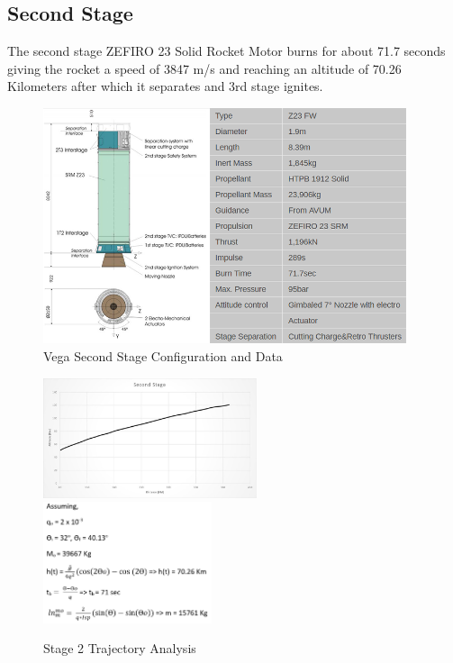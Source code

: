 \documentclass[11pt,fleqn]{book} %
\begin{document}
\newpage

\subsection{Second Stage}

The second stage ZEFIRO 23 Solid Rocket Motor burns for about 71.7 seconds giving the rocket a speed of 3847 m/s and reaching an altitude of 70.26 Kilometers after which it separates and 3rd stage ignites.  
\begin{figure}[h]
    \centering
    \includegraphics[width=0.95\textwidth]{Stage2.png}
    \caption{Vega Second Stage Configuration and Data}
    \label{fig:super}
\end{figure}

\begin{figure}[h]
    \includegraphics[width=0.56\textwidth]{Stage_2_Plot.jpg}
    \includegraphics[width=0.44\textwidth]{Stage2_Cal.png}
    \caption{Stage 2 Trajectory Analysis}
    \label{fig:super}
\end{figure}
\clearpage
\end{document}
